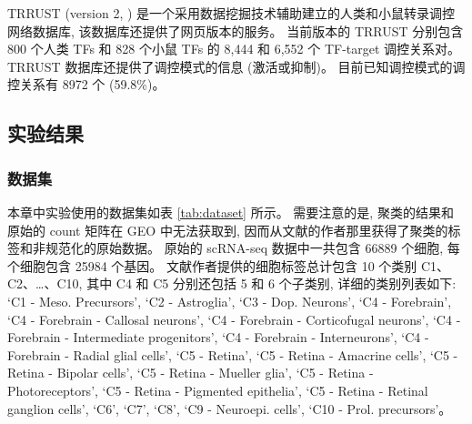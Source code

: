 
TRRUST (version 2, ) 是一个采用数据挖掘技术辅助建立的人类和小鼠转录调控网络数据库,
该数据库还提供了网页版本的服务。
当前版本的 TRRUST 分别包含 800 个人类 TFs 和 828 个小鼠 TFs 的 8,444 和 6,552 个 TF-target 调控关系对。
TRRUST 数据库还提供了调控模式的信息 (激活或抑制)。
目前已知调控模式的调控关系有 8972 个 (59.8\%)。

\subsection{实验结果}
\subsubsection{数据集}
本章中实验使用的数据集如表 \ref{tab:dataset} 所示。
需要注意的是, 聚类的结果和原始的 count 矩阵在 GEO 中无法获取到,
因而从文献的作者那里获得了聚类的标签和非规范化的原始数据。
原始的 scRNA-seq 数据中一共包含 66889 个细胞, 每个细胞包含 25984 个基因。
文献作者提供的细胞标签总计包含 10 个类别 C1、C2、\ldots、C10, 
其中 C4 和 C5 分别还包括 5  和 6 个子类别, 详细的类别列表如下:
`C1 - Meso. Precursors', 
`C2 - Astroglia', `C3 - Dop. Neurons', 
`C4 - Forebrain',
`C4 - Forebrain - Callosal neurons',
`C4 - Forebrain - Corticofugal neurons',
`C4 - Forebrain - Intermediate progenitors',
`C4 - Forebrain - Interneurons',
`C4 - Forebrain - Radial glial cells', 
`C5 - Retina',
`C5 - Retina - Amacrine cells', 
`C5 - Retina - Bipolar cells',
`C5 - Retina - Mueller glia', 
`C5 - Retina - Photoreceptors',
`C5 - Retina - Pigmented epithelia',
`C5 - Retina - Retinal ganglion cells', 
`C6', `C7', `C8',
`C9 - Neuroepi. cells',
`C10 - Prol. precursors'。

